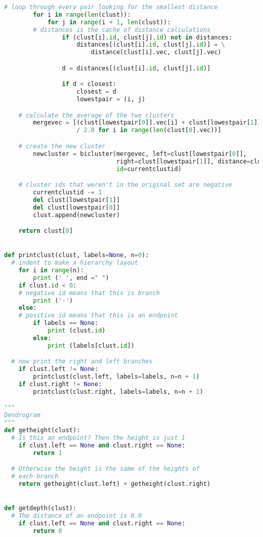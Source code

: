 \documentclass[12pt]{article}
\begin{document}
\begin{lstlisting}[language=Python, caption=three.py , label=2nd:copy]
    # loop through every pair looking for the smallest distance
        for i in range(len(clust)):
            for j in range(i + 1, len(clust)):
        # distances is the cache of distance calculations
                if (clust[i].id, clust[j].id) not in distances:
                    distances[(clust[i].id, clust[j].id)] = \
                        distance(clust[i].vec, clust[j].vec)

                d = distances[(clust[i].id, clust[j].id)]

                if d < closest:
                    closest = d
                    lowestpair = (i, j)

    # calculate the average of the two clusters
        mergevec = [(clust[lowestpair[0]].vec[i] + clust[lowestpair[1]].vec[i])
                    / 2.0 for i in range(len(clust[0].vec))]

    # create the new cluster
        newcluster = bicluster(mergevec, left=clust[lowestpair[0]],
                               right=clust[lowestpair[1]], distance=closest,
                               id=currentclustid)

    # cluster ids that weren't in the original set are negative
        currentclustid -= 1
        del clust[lowestpair[1]]
        del clust[lowestpair[0]]
        clust.append(newcluster)

    return clust[0]


def printclust(clust, labels=None, n=0):
  # indent to make a hierarchy layout
    for i in range(n):
        print (' ', end =" ")
    if clust.id < 0:
    # negative id means that this is branch
        print ('-')
    else:
    # positive id means that this is an endpoint
        if labels == None:
            print (clust.id)
        else:
            print (labels[clust.id])

  # now print the right and left branches
    if clust.left != None:
        printclust(clust.left, labels=labels, n=n + 1)
    if clust.right != None:
        printclust(clust.right, labels=labels, n=n + 1)

"""
Dendrogram
"""
def getheight(clust):
  # Is this an endpoint? Then the height is just 1
    if clust.left == None and clust.right == None:
        return 1

  # Otherwise the height is the same of the heights of
  # each branch
    return getheight(clust.left) + getheight(clust.right)


def getdepth(clust):
  # The distance of an endpoint is 0.0
    if clust.left == None and clust.right == None:
        return 0


\end{lstlisting}
\end{document}
